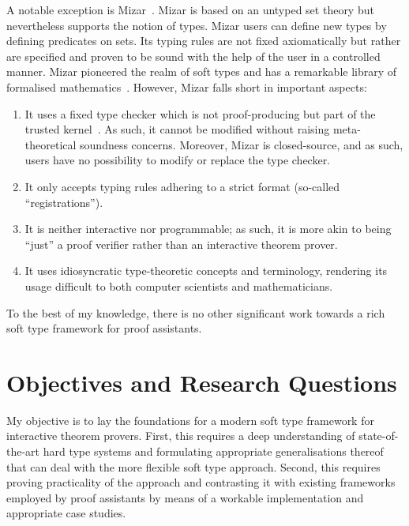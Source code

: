 \documentclass[a4paper, 12pt]{article}
\theoremstyle{plain}
\theoremstyle{definition}
\begin{document}
A notable exception is Mizar~\cite{mizar}.
Mizar is based on an untyped set theory but nevertheless supports the notion of types.
Mizar users can define new types
by defining predicates on sets.
Its typing rules are not fixed axiomatically
but rather are specified and proven to be sound with
the help of the user in a controlled manner.
Mizar pioneered the realm of soft types and has a remarkable
library of formalised mathematics~\cite{mml}.
However, Mizar falls short in important aspects:
\begin{enumerate}
  \item It uses a fixed type checker
    which is not proof-producing but part of the trusted kernel~\cite{wiedijk}.
    As such, it cannot be modified without raising meta-theoretical soundness concerns.
    Moreover, Mizar is closed-source, and as such,
    users have no possibility to modify or replace the type checker.
  \item It only accepts typing rules adhering to a strict format (so-called ``registrations'').
  \item It is neither interactive nor programmable;
    as such, it is more akin to being ``just'' a proof verifier rather than an interactive theorem prover.
  \item It uses idiosyncratic type-theoretic concepts and terminology,
    rendering its usage difficult to both
    computer scientists and mathematicians.
\end{enumerate}

To the best of my knowledge,
there is no other significant work towards
a rich soft type framework for proof assistants.

\section{Objectives and Research Questions}

My objective is to lay the foundations for a modern soft type framework for interactive theorem provers.
First, this requires a deep understanding of state-of-the-art hard type systems
and formulating appropriate generalisations thereof that can deal with the more flexible soft type approach.
Second, this requires proving practicality of the approach and contrasting it with
existing frameworks employed by proof assistants
by means of a workable implementation and appropriate case studies.
\end{document}
